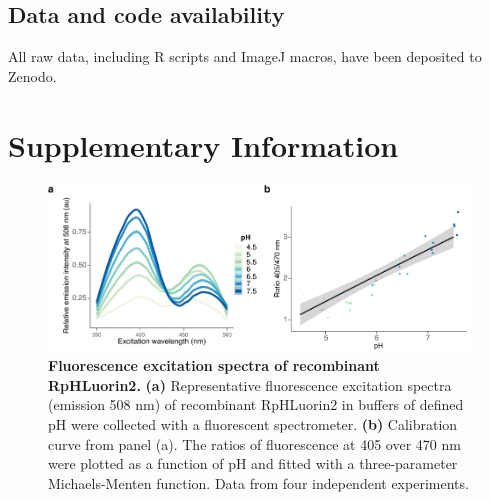 \subsection{Data and code availability}

All raw data, including R scripts and ImageJ macros, have been deposited to Zenodo.


\clearpage

\section{Supplementary Information}

\begin{figure}[h]
    \includegraphics[keepaspectratio=true,width=\textwidth,height=\textheight]{chapters/chapter3/chapter3_SupplementaryFigure1.pdf}
    \caption{\textbf{Fluorescence excitation spectra of recombinant RpHLuorin2.} \textbf{(a)} Representative fluorescence excitation spectra (emission 508 nm) of recombinant RpHLuorin2 in buffers of defined pH were collected with a fluorescent spectrometer. \textbf{(b)} Calibration curve from panel (a). The ratios of fluorescence at 405 over 470 nm were plotted as a function of pH and fitted with a three-parameter Michaels-Menten function. Data from four independent experiments.}
    \label{fig:ch3supfig1}
\end{figure}